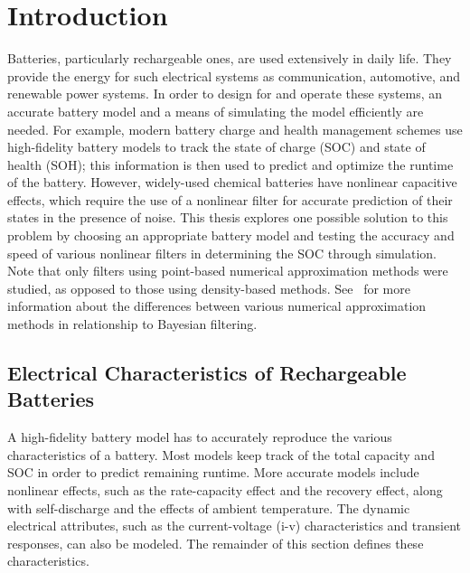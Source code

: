 \documentclass[../zhang_thesis.tex]{subfiles}
\begin{document}
\chapter{Introduction}

Batteries, particularly rechargeable ones, are used extensively in daily life. They provide the energy for such electrical systems as communication, automotive, and renewable power systems. In order to design for and operate these systems, an accurate battery model and a means of simulating the model efficiently are needed. For example, modern battery charge and health management schemes use high-fidelity battery models to track the state of charge (SOC) and state of health (SOH); this
information is then used to predict and optimize the runtime of the battery. However, widely-used chemical batteries have nonlinear capacitive effects, which require the use of a nonlinear filter for accurate prediction of their states in the presence of noise. This thesis explores one possible solution to this problem by choosing an appropriate battery model and testing the accuracy and speed of various nonlinear filters in determining the SOC through simulation. Note that only filters
using point-based numerical approximation methods were studied, as opposed to those using density-based methods. See~\cite{chen03} for more information about the differences between various numerical approximation methods in relationship to Bayesian filtering.


\section{Electrical Characteristics of Rechargeable Batteries}
\label{sec:echar}

A high-fidelity battery model has to accurately reproduce the various characteristics of a battery. Most models keep track of the total capacity and SOC in order to predict remaining runtime. More accurate models include nonlinear effects, such as the rate-capacity effect and the recovery effect, along with self-discharge and the effects of ambient temperature. The dynamic electrical attributes, such as the current-voltage (i-v) characteristics and transient responses, can also be
modeled. The remainder of this section defines these characteristics.
\end{document}
